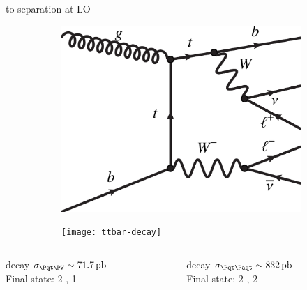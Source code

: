 \begin{frame}{\tW to \ttbar separation at LO}
    \begin{figure}[htbp]
    \centering
    \begin{subfigure}[b]{0.4\textwidth}
        \includegraphics[width=\textwidth]{feynman_diagrams/tW-decay.pdf}
        \label{fig:nlo:tw}
    \end{subfigure}
\quad
    \begin{subfigure}[b]{0.4\textwidth}
        \texttt{[image: ttbar-decay]}
        \label{fig:nlo:ttbar}
    \end{subfigure}
\end{figure}
%
\begin{columns}
\quad
    \begin{column}{0.45\textwidth}
    \begin{block}{\tW decay}
    $\sigma_{\tW} \sim \SI{71.7}{\pico\barn}$\\
    Final state: 2 \PW, 1 \Pbottom
    \end{block}
    \end{column}
    \quad
    \begin{column}{0.45\textwidth}
    \begin{block}{\ttbar decay}
    $\sigma_{\ttbar} \sim \SI{832}{\pico\barn}$\\
    Final state: 2 \PW, 2 \Pbottom
    \end{block}
    \end{column}
\quad
\end{columns}
\end{frame}

